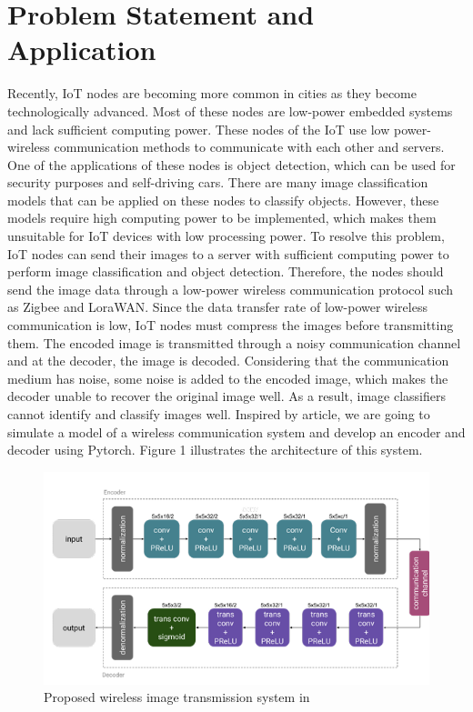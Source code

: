 \documentclass[10pt,twocolumn,letterpaper]{article}
\begin{document}
\section{Problem Statement and Application}
\label{sec:problemstatement}
Recently, IoT nodes are becoming more common in cities as they become technologically advanced. Most of these nodes are low-power embedded systems and lack sufficient computing power. These nodes of the IoT use low power-wireless communication methods to communicate with each other and servers. One of the applications of these nodes is object detection, which can be used for security purposes and self-driving cars. There are many image classification models that can be applied on these nodes to classify objects. However, these models require high computing power to be implemented, which makes them unsuitable for IoT devices with low processing power. To resolve this problem, IoT nodes can send their images to a server with sufficient computing power to perform image classification and object detection. Therefore, the nodes should send the image data through a low-power wireless communication protocol such as Zigbee and LoraWAN. Since the data transfer rate of low-power wireless communication is low, IoT nodes must compress the images before transmitting them. The encoded image is transmitted through a noisy communication channel and at the decoder, the image is decoded. Considering that the communication medium has noise, some noise is added to the encoded image, which makes the decoder unable to recover the original image well. As a result, image classifiers cannot identify and classify images well. Inspired by article\cite{Alpher07}, we are going to simulate a model of a wireless communication system and develop an encoder and decoder using Pytorch. Figure 1 illustrates the architecture of this system. 
\begin{figure}[h]
    \centering
    \includegraphics[scale=0.5]{ae.png}
    \caption{Proposed wireless image transmission system in \cite{Alpher07}}
\end{figure}
\end{document}

